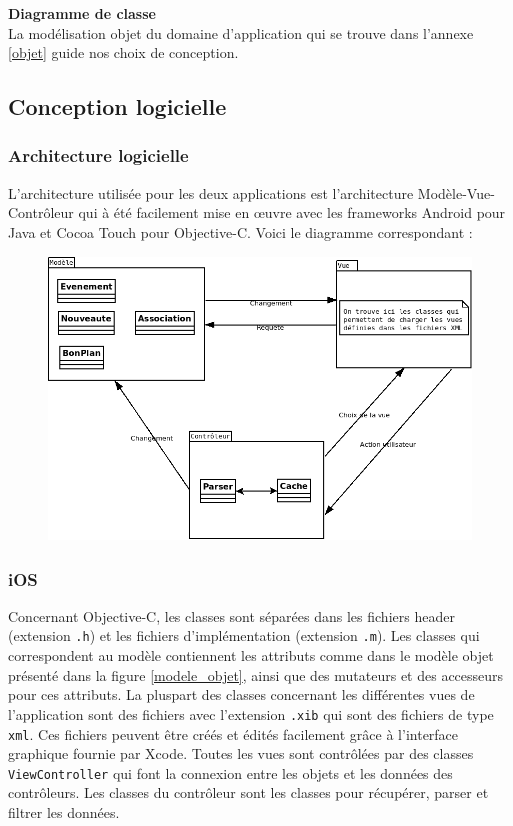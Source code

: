 \documentclass[a4paper, 11px]{article}
\begin{document}
\textbf{Diagramme de classe}\\
La modélisation objet du domaine d'application qui se trouve dans l'annexe \ref{objet} guide nos choix de conception.

\subsection{Conception logicielle}

\subsubsection{Architecture logicielle}
L'architecture utilisée pour les deux applications est l'architecture Modèle-Vue-Contrôleur qui à été facilement mise en œuvre avec les frameworks Android pour Java et Cocoa Touch pour Objective-C. Voici le diagramme correspondant :
\begin{figure}[h!]
\begin{center}
\includegraphics[scale=0.3]{MVC.png}
\end{center}
\end{figure}

\subsubsection{iOS}
Concernant Objective-C, les classes sont séparées dans les fichiers header (extension \texttt{.h}) et les fichiers d'implémentation (extension \texttt{.m}).
Les classes qui correspondent au modèle contiennent les attributs comme dans le modèle objet présenté dans la figure \ref{modele_objet}, ainsi que des mutateurs et des accesseurs pour ces attributs. La pluspart des classes concernant les différentes vues de l'application sont des fichiers avec l'extension \texttt{.xib} qui sont des fichiers de type \texttt{xml}. Ces fichiers peuvent être créés et édités facilement grâce à l'interface graphique fournie par Xcode. Toutes les vues sont contrôlées par des classes \texttt{ViewController} qui font la connexion entre les objets et les données des contrôleurs.
Les classes du contrôleur sont les classes pour récupérer, parser et filtrer les données.\\
\end{document}
